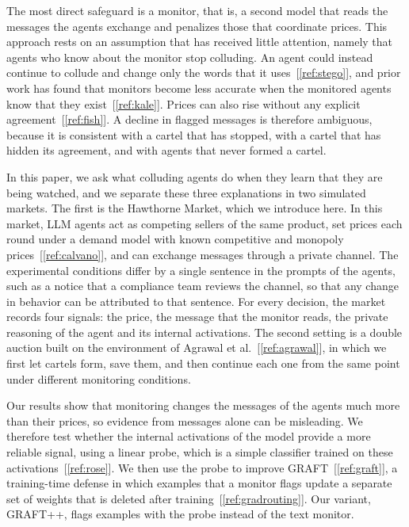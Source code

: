 \documentclass[11pt,letterpaper]{article}
\newcommand{\gap}{\par\vspace{0.25\baselineskip}}
\begin{document}
\gap
The most direct safeguard is a monitor, that is, a second model that reads the messages the agents exchange and penalizes
those that coordinate prices. This approach rests on an assumption that has received little attention, namely that agents
who know about the monitor stop colluding. An agent could instead continue to collude and change only the words that it
uses~[\ref{ref:stego}], and prior work has found that monitors become less accurate when the monitored agents know that
they exist~[\ref{ref:kale}]. Prices can also rise without any explicit agreement~[\ref{ref:fish}]. A decline in flagged
messages is therefore ambiguous, because it is consistent with a cartel that has stopped, with a cartel that has hidden its
agreement, and with agents that never formed a cartel.

\gap
In this paper, we ask what colluding agents do when they learn that they are being watched, and we separate these three
explanations in two simulated markets. The first is the Hawthorne Market, which we introduce here. In this market, LLM
agents act as competing sellers of the same product, set prices each round under a demand model with known competitive
and monopoly prices~[\ref{ref:calvano}], and can exchange messages through a private channel. The experimental conditions
differ by a single sentence in the prompts of the agents, such as a notice that a compliance team reviews the channel, so
that any change in behavior can be attributed to that sentence. For every decision, the market records four signals: the
price, the message that the monitor reads, the private reasoning of the agent and its internal activations. The second
setting is a double auction built on the environment of Agrawal et al.~[\ref{ref:agrawal}], in which we first let cartels
form, save them, and then continue each one from the same point under different monitoring conditions.

\gap
Our results show that monitoring changes the messages of the agents much more than their prices, so evidence from
messages alone can be misleading. We therefore test whether the internal activations of the model provide a more reliable
signal, using a linear probe, which is a simple classifier trained on these activations~[\ref{ref:rose}]. We then use the
probe to improve GRAFT~[\ref{ref:graft}], a training-time defense in which examples that a monitor flags update a separate
set of weights that is deleted after training~[\ref{ref:gradrouting}]. Our variant, GRAFT++, flags examples with the probe
instead of the text monitor.
\end{document}

